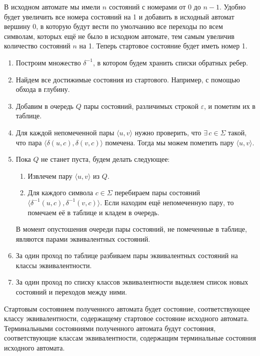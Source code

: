 \documentclass[a4paper,12pt]{article}
\begin{document}
	В исходном автомате мы имели $n$ состояний с номерами от 0 до $n - 1$. Удобно будет увеличить все номера состояний на 1 и добавить в исходный автомат вершину 0, в которую будут вести по умолчанию все переходы по всем символам, которых ещё не было в исходном автомате, тем самым увеличив количество состояний $n$ на 1. Теперь стартовое состояние будет иметь номер 1.
	\begin{enumerate}
		\item Построим множество $\delta^{-1}$, в котором будем хранить списки обратных ребер.
		
		\item Найдем все достижимые состояния из стартового. Например, с помощью обхода в глубину.
		
		\item Добавим в очередь $Q$ пары состояний, различимых строкой $\varepsilon$, и пометим их в таблице.
		
		\item Для каждой непомеченной пары $\langle u, v \rangle$ нужно проверить, что $\exists\,c \in \Sigma$ такой, что пара $\langle \delta(u, c), \delta(v, c) \rangle$ помечена. Тогда мы можем пометить пару $\langle u, v \rangle$.
		
		\item Пока $Q$ не станет пуста, будем делать следующее:
		\begin{enumerate}
			\item Извлечем пару $\langle u, v \rangle$ из $Q$.
			
			\item Для каждого символа $c \in \Sigma$ перебираем пары состояний $\langle \delta^{-1}(u, c), \delta^{-1}(v,c) \rangle$. Если находим ещё непомеченную пару, то помечаем её в таблице и кладем в очередь.
		\end{enumerate}
		В момент опустошения очереди пары состояний, не помеченные в таблице, являются парами эквивалентных состояний.
		
		\item За один проход по таблице разбиваем пары эквивалентных состояний на классы эквивалентности.
	
		\item За один проход по списку классов эквивалентности выделяем список новых состояний и переходов между ними.
	\end{enumerate}

	Стартовым состоянием полученного автомата будет состояние, соответствующее классу эквивалентности, содержащему стартовое состояние исходного автомата.
	Терминальными состояниями полученного автомата будут состояния, соответствующие классам эквивалентности, содержащим терминальные состояния исходного автомата.
	
\end{document}
